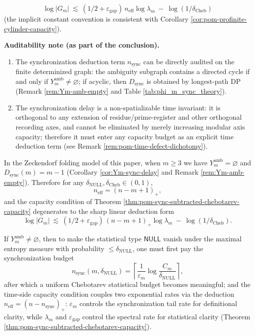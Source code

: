 \begin{theorem}
\[
\boxed{\;
\log |G_m|
\ \lesssim\
(1/2+\varepsilon_{\mathrm{gap}})\,n_{\mathrm{eff}}\log\lambda_m
\ -\
\log(1/\delta_{\mathrm{Cheb}})
\;}
\]
(the implicit constant convention is consistent with Corollary \ref{cor:pom-profinite-cylinder-capacity}).
\par
\noindent\textbf{Auditability note (as part of the conclusion).}
\begin{enumerate}
  \item The synchronization deduction term \(n_{\mathrm{sync}}\) can be directly audited on the finite determinized graph: the ambiguity subgraph contains a directed cycle if and only if \(Y_m^{\mathrm{amb}}\neq\varnothing\); if acyclic, then \(D_{\mathrm{sync}}\) is obtained by longest-path DP (Remark \ref{rem:Ym-amb-empty} and Table \ref{tab:phi_m_sync_theory}).
  \item The synchronization delay is a non-spatializable time invariant: it is orthogonal to any extension of residue/prime-register and other orthogonal recording axes, and cannot be eliminated by merely increasing modular axis capacity; therefore it must enter any capacity budget as an explicit time deduction term (see Remark \ref{rem:pom-time-defect-dichotomy}).
\end{enumerate}
\end{theorem}

\begin{corollary}\label{cor:pom-sync-subtracted-chebotarev-zeckendorf}
In the Zeckendorf folding model of this paper, when \(m\ge 3\) we have \(Y_m^{\mathrm{amb}}=\varnothing\) and \(D_{\mathrm{sync}}(m)=m-1\) (Corollary \ref{cor:Ym-sync-delay} and Remark \ref{rem:Ym-amb-empty}).
Therefore for any \(\delta_{\mathrm{NULL}},\delta_{\mathrm{Cheb}}\in(0,1)\),
\[
n_{\mathrm{eff}}=(n-m+1)_+,
\]
and the capacity condition of Theorem \ref{thm:pom-sync-subtracted-chebotarev-capacity} degenerates to the sharp linear deduction form
\[
\log |G_m|
\ \lesssim\
(1/2+\varepsilon_{\mathrm{gap}})\,(n-m+1)_+\log\lambda_m
\ -\
\log(1/\delta_{\mathrm{Cheb}}).
\]
\end{corollary}

\begin{corollary}\label{cor:pom-sync-subtracted-chebotarev-weak}
If \(Y_m^{\mathrm{amb}}\neq\varnothing\), then to make the statistical type \(\mathsf{NULL}\) vanish under the maximal entropy measure with probability \(\le \delta_{\mathrm{NULL}}\), one must first pay the synchronization budget
\[
n_{\mathrm{sync}}(m,\delta_{\mathrm{NULL}})
=\left\lceil \dfrac{1}{\varepsilon_m}\log\dfrac{C_m}{\delta_{\mathrm{NULL}}}\right\rceil,
\]
after which a uniform Chebotarev statistical budget becomes meaningful; and the time-side capacity condition couples two exponential rates via the deduction \(n_{\mathrm{eff}}=(n-n_{\mathrm{sync}})_+\): \(\varepsilon_m\) controls the synchronization tail rate for definitional clarity, while \(\lambda_m\) and \(\varepsilon_{\mathrm{gap}}\) control the spectral rate for statistical clarity (Theorem \ref{thm:pom-sync-subtracted-chebotarev-capacity}).
\end{corollary}

